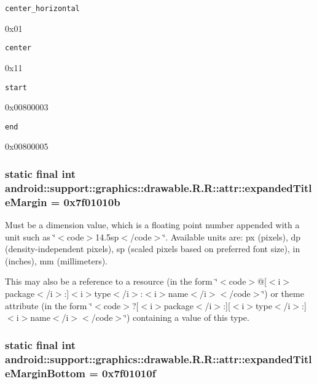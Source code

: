 {\tt center\_\-horizontal}

0x01

{\tt center}

0x11

{\tt start}

0x00800003

{\tt end}

0x00800005\hypertarget{classandroid_1_1support_1_1graphics_1_1drawable_1_1_r_1_1attr_96b88d248c834a6c6a2f377079b5ecee}{
\subsubsection[{expandedTitleMargin}]{\setlength{\rightskip}{0pt plus 5cm}static final int android::support::graphics::drawable.R.R::attr::expandedTitleMargin = 0x7f01010b}}
\label{classandroid_1_1support_1_1graphics_1_1drawable_1_1_r_1_1attr_96b88d248c834a6c6a2f377079b5ecee}


Must be a dimension value, which is a floating point number appended with a unit such as \char`\"{}$<$code$>$14.5sp$<$/code$>$\char`\"{}. Available units are: px (pixels), dp (density-independent pixels), sp (scaled pixels based on preferred font size), in (inches), mm (millimeters). 

This may also be a reference to a resource (in the form \char`\"{}$<$code$>$@\mbox{[}$<$i$>$package$<$/i$>$:\mbox{]}$<$i$>$type$<$/i$>$:$<$i$>$name$<$/i$>$$<$/code$>$\char`\"{}) or theme attribute (in the form \char`\"{}$<$code$>$?\mbox{[}$<$i$>$package$<$/i$>$:\mbox{]}\mbox{[}$<$i$>$type$<$/i$>$:\mbox{]}$<$i$>$name$<$/i$>$$<$/code$>$\char`\"{}) containing a value of this type. \hypertarget{classandroid_1_1support_1_1graphics_1_1drawable_1_1_r_1_1attr_a7e811a054ff0f14f5ff88485570c4f4}{
\subsubsection[{expandedTitleMarginBottom}]{\setlength{\rightskip}{0pt plus 5cm}static final int android::support::graphics::drawable.R.R::attr::expandedTitleMarginBottom = 0x7f01010f}}
\label{classandroid_1_1support_1_1graphics_1_1drawable_1_1_r_1_1attr_a7e811a054ff0f14f5ff88485570c4f4}


